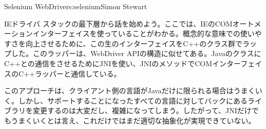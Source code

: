 \begin{aosachapter}{Selenium WebDriver}{s:selenium}{Simon Stewart}
\begin{aosasect1}{IEドライバ}
スタックの最下層から話を始めよう。ここでは、IEのCOMオートメーションインターフェイスを使っていることがわかる。概念的な意味での使いやすさを向上させるために、この生のインターフェイスをC++のクラス群でラップした。このラッパーは、WebDriver APIの構造に似せてある。JavaのクラスにC++との通信をさせるためにJNIを使い、JNIのメソッドでCOMインターフェイスのC++ラッパーと通信している。

このアプローチは、クライアント側の言語がJavaだけに限られる場合はうまくいく。しかし、サポートすることになったすべての言語に対してバックにあるライブラリを変更するのは大変だし、複雑になってしまう。したがって、JNIだけでもうまくいくとは言え、これだけではまだ適切な抽象化が実現できていない。


\end{aosasect1}
\end{aosachapter}
